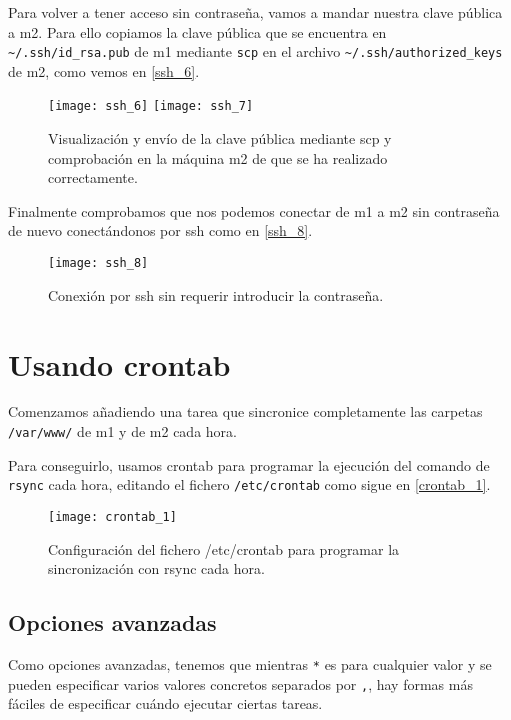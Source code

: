 Para volver a tener acceso sin contraseña, vamos a mandar nuestra clave pública a m2. Para ello copiamos la clave pública que se encuentra en \verb|~/.ssh/id_rsa.pub| de m1 mediante \verb|scp| en el archivo \verb|~/.ssh/authorized_keys| de m2, como vemos en \eqref{ssh_6}.

\begin{figure}
\begin{center}
\caption{Visualización y envío de la clave pública mediante scp y comprobación en la máquina m2 de que se ha realizado correctamente.}
\label{ssh_6}
\texttt{[image: ssh\_6]}
\texttt{[image: ssh\_7]}
\end{center}
\end{figure}

Finalmente comprobamos que nos podemos conectar de m1 a m2 sin contraseña de nuevo conectándonos por ssh como en \eqref{ssh_8}.

\begin{figure}
\begin{center}
\caption{Conexión por ssh sin requerir introducir la contraseña.}
\label{ssh_8}
\texttt{[image: ssh\_8]}
\end{center}
\end{figure}

\chapter{Usando crontab}

Comenzamos añadiendo una tarea que sincronice completamente las carpetas \verb|/var/www/| de m1 y de m2 cada hora.

Para conseguirlo, usamos crontab para programar la ejecución del comando de \verb|rsync| cada hora, editando el fichero \verb|/etc/crontab| como sigue en \eqref{crontab_1}.

\begin{figure}
\begin{center}
\caption{Configuración del fichero /etc/crontab para programar la sincronización con rsync cada hora.}
\label{crontab_1}
\texttt{[image: crontab\_1]}
\end{center}
\end{figure}

\section{Opciones avanzadas}

Como opciones avanzadas, tenemos que mientras \verb|*| es para cualquier valor y se pueden especificar varios valores concretos separados por \verb|,|, hay formas más fáciles de especificar cuándo ejecutar ciertas tareas.

